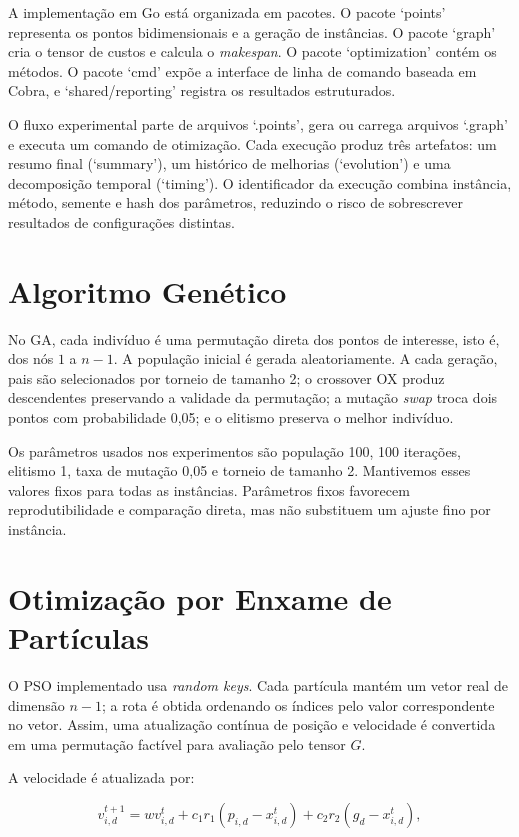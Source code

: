A implementação em Go está organizada em pacotes. O pacote `points' representa os pontos bidimensionais e a geração de instâncias. O pacote `graph' cria o tensor de custos e calcula o \textit{makespan}. O pacote `optimization' contém os métodos. O pacote `cmd' expõe a interface de linha de comando baseada em Cobra, e `shared/reporting' registra os resultados estruturados.

O fluxo experimental parte de arquivos `.points', gera ou carrega arquivos `.graph' e executa um comando de otimização. Cada execução produz três artefatos: um resumo final (`summary'), um histórico de melhorias (`evolution') e uma decomposição temporal (`timing'). O identificador da execução combina instância, método, semente e hash dos parâmetros, reduzindo o risco de sobrescrever resultados de configurações distintas.

\section{Algoritmo Genético}

No \ac{GA}, cada indivíduo é uma permutação direta dos pontos de interesse, isto é, dos nós $1$ a $n-1$. A população inicial é gerada aleatoriamente. A cada geração, pais são selecionados por torneio de tamanho 2; o crossover \ac{OX} produz descendentes preservando a validade da permutação; a mutação \textit{swap} troca dois pontos com probabilidade 0,05; e o elitismo preserva o melhor indivíduo.

Os parâmetros usados nos experimentos são população 100, 100 iterações, elitismo 1, taxa de mutação 0,05 e torneio de tamanho 2. Mantivemos esses valores fixos para todas as instâncias. Parâmetros fixos favorecem reprodutibilidade e comparação direta, mas não substituem um ajuste fino por instância.

\section{Otimização por Enxame de Partículas}

O \ac{PSO} implementado usa \textit{random keys}. Cada partícula mantém um vetor real de dimensão $n-1$; a rota é obtida ordenando os índices pelo valor correspondente no vetor. Assim, uma atualização contínua de posição e velocidade é convertida em uma permutação factível para avaliação pelo tensor $G$.

A velocidade é atualizada por:

\begin{equation}
v_{i,d}^{t+1} = w v_{i,d}^{t} + c_1 r_1(p_{i,d}-x_{i,d}^{t}) + c_2 r_2(g_d-x_{i,d}^{t}),
\label{eq:pso}
\end{equation}

